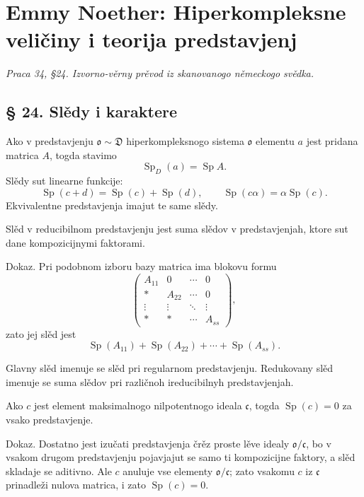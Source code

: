 \documentclass[11pt]{article}
\providecommand{\mo}{\mathfrak{o}}
\providecommand{\mc}{\mathfrak{c}}
\begin{document}
\section*{Emmy Noether: Hiperkompleksne veličiny i teorija predstavjenj}
\emph{Praca 34, §24. Izvorno-věrny prěvod iz skanovanogo německogo svědka.}

\subsection*{§ 24. Slědy i karaktere}

Ako v predstavjenju $\mo\sim\mathfrak D$ hiperkompleksnogo sistema $\mo$ elementu $a$ jest pridana matrica $A$, togda stavimo
\[
        \operatorname{Sp}_{D}(a)=\operatorname{Sp} A.
\]
Slědy sut linearne funkcije:
\[
        \operatorname{Sp}(c+d)=\operatorname{Sp}(c)+\operatorname{Sp}(d),
        \qquad
        \operatorname{Sp}(c\alpha)=\alpha\operatorname{Sp}(c).
\]
Ekvivalentne predstavjenja imajut te same slědy.

Slěd v reducibilnom predstavjenju jest suma slědov v predstavjenjah, ktore sut dane kompozicijnymi faktorami.

Dokaz. Pri podobnom izboru bazy matrica ima blokovu formu
\[
        \begin{pmatrix}
        A_{11}&0&\cdots&0\\
        *&A_{22}&\cdots&0\\
        \vdots&\vdots&\ddots&\vdots\\
        *&*&\cdots&A_{ss}
        \end{pmatrix},
\]
zato jej slěd jest
\[
        \operatorname{Sp}(A_{11})+\operatorname{Sp}(A_{22})+\cdots+\operatorname{Sp}(A_{ss}).
\]

Glavny slěd imenuje se slěd pri regularnom predstavjenju. Redukovany slěd imenuje se suma slědov pri različnoh ireducibilnyh predstavjenjah.

Ako $c$ jest element maksimalnogo nilpotentnogo ideala $\mc$, togda $\operatorname{Sp}(c)=0$ za vsako predstavjenje.

Dokaz. Dostatno jest izučati predstavjenja črěz proste lěve idealy $\mo/\mc$, bo v vsakom drugom predstavjenju pojavjajut se samo ti kompozicijne faktory, a slěd skladaje se aditivno. Ale $c$ anuluje vse elementy $\mo/\mc$; zato vsakomu $c$ iz $\mc$ prinadleži nulova matrica, i zato $\operatorname{Sp}(c)=0$.
\end{document}
